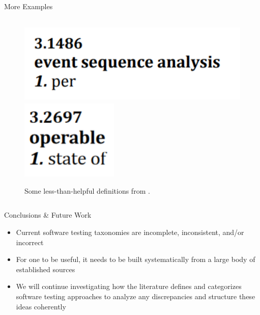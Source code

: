 \documentclass[22pt]{beamer}
\begin{document}
\begin{frame}[fragile]
\begin{textblock}{7.25}
\begin{block}{\fontsize{37}{20}\selectfont More Examples}
\begin{columns}
\begin{column}{0.475\textwidth}
\begin{center}
\begin{figure}
                            \vspace{2mm}

                            \includegraphics[height=3.9cm]{per.png}
                            \includegraphics[height=3.8cm]{state of.png}
                            \label{Fig:unhelpful-defs}
                            \caption{Some less-than-helpful definitions from
                                \cite[pp.~421, 170, 301, counterclockwise from top]{IEEE2017}.}
                        \end{figure}
                    \end{center}
                \end{column}
            \end{columns}
        \end{block}

        \begin{block}{\fontsize{37}{20}\selectfont Conclusions \& Future Work}
            \begin{itemize}
                \item Current software testing taxonomies are incomplete,
                      inconsistent, and/or incorrect
                \item For one to be useful, it needs to be built systematically
                      from a large body of established sources
                \item We will continue investigating how the literature defines
                      and categorizes software testing approaches to analyze any
                      discrepancies and structure these ideas coherently
            \end{itemize}
        \end{block}


\end{textblock}
\end{frame}
\end{document}
